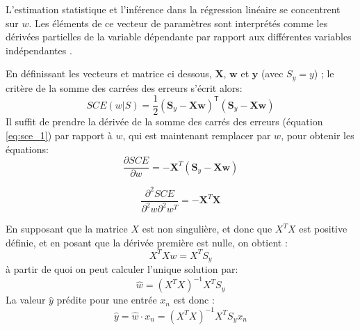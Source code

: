 	
	L'estimation statistique et l'inférence dans la régression linéaire se concentrent sur $w$. Les éléments de ce vecteur de paramètres sont interprétés comme les dérivées partielles de la variable dépendante par rapport aux différentes variables indépendantes \cite{darlington2016regression}.
	
	En définissant les vecteurs  et matrice ci dessous, ${\boldsymbol X}$, ${\boldsymbol w}$ et ${\boldsymbol y}$ (avec ${S_y = y}$) \cite{antoine2018apprentissage}; le critère de la somme des carrées des erreurs s'écrit alors:
	\begin{equation}\label{eq:sce_2}
	SCE(w|\mathit{S}) = \frac{1}{2} ({\boldsymbol S_y }- \mathbf{X}\boldsymbol w)^{\mathsf{T}}({ \boldsymbol S_y }- \mathbf{X} \boldsymbol w)
	\end{equation}  
	Il suffit de prendre la dérivée de la somme des carrés des erreurs (équation \ref{eq:sce_1}) par rapport à $w$, qui est maintenant remplacer par $w$, pour obtenir les équations: 
	$$
	\frac{\partial SCE}{\partial w} = -{\boldsymbol X}^T({\boldsymbol S_y }- \mathbf{X} \boldsymbol w)
	$$
	
	$$
	\frac{\partial^2 SCE}{\partial^2 w \partial^2 w^T} = -{\boldsymbol X}^T{\boldsymbol X}
	$$
	
	En supposant que la matrice $X$ est non singulière, et donc que $X^TX$ est positive définie, et en posant que la dérivée première est nulle, on obtient :
	\begin{equation}
	{X^{T} Xw =  X^{T} S_y}
	\end{equation}
	à partir de quoi on peut calculer l'unique solution par: 
	\begin{equation}
	\hat{w} = {(X^{T} X)^{-1} X^{T} S_y}
	\end{equation}
	La valeur $\hat{y}$ prédite pour une entrée $x_n$ est donc : 
	$$
	\hat{y} = \hat{w}\cdot x_n = {(X^{T} X)^{-1} X^{T} S_y}x_n 
	$$ 
	
	
	
